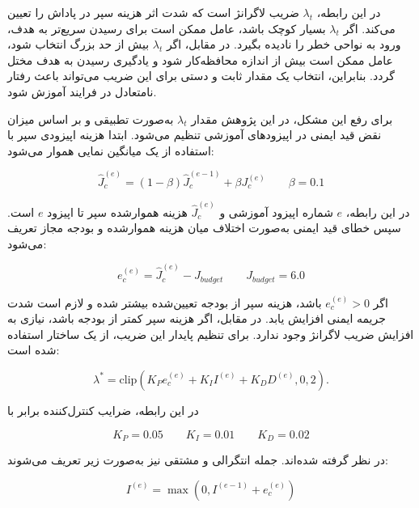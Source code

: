 در این رابطه، \(\lambda_t\) ضریب لاگرانژ است که شدت اثر هزینه سپر در پاداش را تعیین می‌کند. اگر \(\lambda_t\) بسیار کوچک باشد، عامل ممکن است برای رسیدن سریع‌تر به هدف، ورود به نواحی خطر را نادیده بگیرد. در مقابل، اگر \(\lambda_t\) بیش از حد بزرگ انتخاب شود، عامل ممکن است بیش از اندازه محافظه‌کار شود و یادگیری رسیدن به هدف مختل گردد. بنابراین، انتخاب یک مقدار ثابت و دستی برای این ضریب می‌تواند باعث رفتار نامتعادل در فرایند آموزش شود.

برای رفع این مشکل، در این پژوهش مقدار \(\lambda_t\) به‌صورت تطبیقی و بر اساس میزان نقض قید ایمنی در اپیزودهای آموزشی تنظیم می‌شود. ابتدا هزینه اپیزودی سپر با استفاده از یک میانگین نمایی هموار می‌شود:

\begin{equation}
	\hat{J}^{(e)}_c =
	(1-\beta)\hat{J}^{(e-1)}_c
	+
	\beta J^{(e)}_c
	\qquad
	\beta=0.1
	\label{eq:shield_cost_ema_final}
\end{equation}

در این رابطه، \(e\) شماره اپیزود آموزشی و \(\hat{J}^{(e)}_c\) هزینه هموارشده سپر تا اپیزود \(e\) است. سپس خطای قید ایمنی به‌صورت اختلاف میان هزینه هموارشده و بودجه مجاز تعریف می‌شود:

\begin{equation}
	e_c^{(e)} =
	\hat{J}^{(e)}_c
	-
	J_{budget}
	\qquad
	J_{budget}=6.0
	\label{eq:shield_constraint_error_final}
\end{equation}

اگر \(e_c^{(e)}>0\) باشد، هزینه سپر از بودجه تعیین‌شده بیشتر شده و لازم است شدت جریمه ایمنی افزایش یابد. در مقابل، اگر هزینه سپر کمتر از بودجه باشد، نیازی به افزایش ضریب لاگرانژ وجود ندارد. برای تنظیم پایدار این ضریب، از یک ساختار  استفاده شده است:

\begin{equation}
	\lambda^{*} =
	\mathrm{clip}
	\left(
	K_P e_c^{(e)}
	+
	K_I I^{(e)}
	+
	K_D D^{(e)},
	0,
	2
	\right).
	\label{eq:pid_lambda_raw_final}
\end{equation}

در این رابطه، ضرایب کنترل‌کننده برابر با

\begin{equation}
	K_P=0.05
	\qquad
	K_I=0.01
	\qquad
	K_D=0.02
	\label{eq:pid_gains_final}
\end{equation}

در نظر گرفته شده‌اند. جمله انتگرالی و مشتقی نیز به‌صورت زیر تعریف می‌شوند:

\begin{equation}
	I^{(e)}
	=
	\max
	\left(
	0,
	I^{(e-1)}+e_c^{(e)}
	\right)
	\label{eq:pid_integral_final}
\end{equation}

